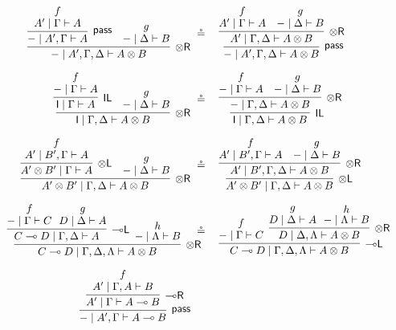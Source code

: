 \documentclass[sn-mathphys-num]{sn-jnl}%
\newcommand{\GG}{\Gamma}
\newcommand{\GD}{\Delta}
\newcommand{\GL}{\Lambda}
\newcommand{\vd}{\vdash}
\newcommand{\tl}{\otimes \mathsf{L}}
\newcommand{\tr}{\otimes\mathsf{R}}
\newcommand{\pass}{\mathsf{pass}}
\newcommand{\unitl}{\mathsf{IL}}
\newcommand{\ot}{\otimes}
\newcommand{\lolli}{\multimap}
\newcommand{\lleft}{{\lolli}\mathsf{L}}
\newcommand{\lright}{{\lolli}\mathsf{R}}
\newcommand{\unit}{\mathsf{I}}
\newcommand{\proofbox}[1]{\begin{tabular}{l} #1 \end{tabular}}
\theoremstyle{thmstyleone}%
\theoremstyle{thmstyletwo}%
\theoremstyle{thmstylethree}%
\begin{document}
\begin{figure}
\begin{displaymath}
\arraycolsep=0pt    
\begin{array}{rcl}
  \proofbox{
    \infer[\tr]{{-} \mid A' , \GG , \GD \vd A \ot B}{
      \infer[\pass]{{-} \mid A' , \GG \vd A}{
        \deduce{A' \mid \GG \vd A}{f}
      }
      &
      \deduce{{-} \mid \GD \vd B}{g}
    }
  }
  
  &\circeq&
  
  \proofbox{
    \infer[\pass]{{-} \mid A' , \GG , \GD \vd A \ot B}{
      \infer[\tr]{A' \mid \GG , \GD \vd A \ot B}{
        \deduce{A' \mid \GG \vd A}{f}
        &
        \deduce{{-} \mid \GD \vd B}{g}
      }
    }
  }
  \\[30pt]
  \proofbox{
    \infer[\tr]{\unit \mid \GG , \GD \vd A \ot B}{
      \infer[\unitl]{\unit \mid \GG \vd A}{
        \deduce{{-} \mid \GG \vd A}{f}
      }
      &
      \deduce{{-} \mid \GD \vd B}{g}
    }
  }
  
  &\circeq&
  
  \proofbox{
    \infer[\unitl]{\unit \mid \GG , \GD \vd A \ot B}{
      \infer[\tr]{{-} \mid \GG , \GD \vd A \ot B}{
        \deduce{{-} \mid \GG \vd A}{f}
        &
        \deduce{{-} \mid \GD \vd B}{g}
      }
    }
  }
  \\[30pt]
  \proofbox{
    \infer[\tr]{A' \ot B' \mid \GG , \GD \vd A \ot B}{
      \infer[\tl]{A' \ot B' \mid \GG \vd A}{
        \deduce{A' \mid B' , \GG \vd A}{f}
      }
      &
      \deduce{{-} \mid \GD \vd B}{g}
    }
  }
  
  &\circeq&
  
  \proofbox{
    \infer[\tl]{A' \ot B' \mid \GG , \GD \vd A \ot B}{
      \infer[\tr]{A' \mid B' , \GG , \GD \vd A \ot B}{
        \deduce{A' \mid B', \GG \vd A}{f}
        &
        \deduce{{-} \mid \GD \vd B}{g}
      }
    }
  }
  \\[30pt]
  \proofbox{
    \infer[\tr]{C \lolli D \mid \GG , \GD , \GL \vd A \ot B}{
      \infer[\lleft]{C \lolli D \mid \GG , \GD \vd A}{
        \deduce{{-} \mid \GG \vd C}{f}
        & \!\!
        \deduce{D \mid \GD \vd A}{g}
      }
      & \!\!\!
      \deduce{{-} \mid \GL \vd B}{h}
    }
  } \!\!\!\!\!\!
  
  &\circeq&
  
  \proofbox{
    \infer[\lleft]{C \lolli D \mid \GG , \GD  , \GL\vd A \ot B}{
      \deduce{{-} \mid \GG \vd C}{f}
      & \!\!\!
      \infer[\tr]{D \mid \GD, \GL \vd A \ot B}{
        \deduce{D \mid \GD \vd A}{g}
        & \!\!
        \deduce{{-} \mid \GL \vd B}{h}
      }
    }
  }
  \\[30pt]
  \proofbox{
    \infer[\pass]{{-} \mid A' , \GG \vd A \lolli B}{
      \infer[\lright]{A' \mid \GG \vd A \lolli B}{
        \deduce{A' \mid \GG , A \vd B}{f}
      }
    }
  }
  

\end{array}
\end{displaymath}
\end{figure}
\end{document}
